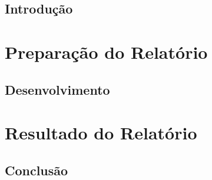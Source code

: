 \documentclass[12pt,a4paper,oneside]{memoir}
\begin{document}
\chapter*{Introdução}




%
\part{Preparação do Relatório}
\chapter{Desenvolvimento}
\part{Resultado do Relatório}
\chapter{Conclusão}
\end{document}
